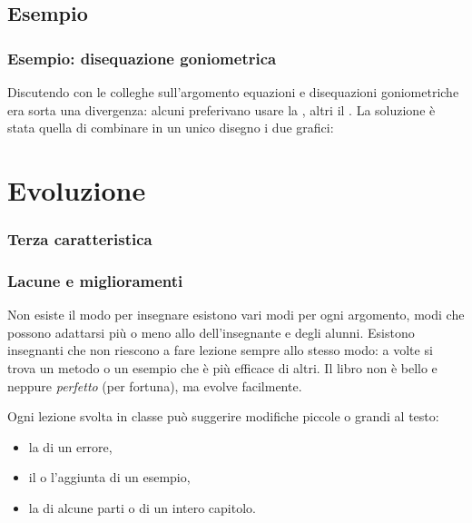 \documentclass{beamer} %
\begin{document}
\subsection{Esempio} 

\begin{frame}\frametitle{Esempio: disequazione goniometrica}

Discutendo con le colleghe sull'argomento equazioni e 
disequazioni goniometriche era sorta una divergenza: alcuni preferivano 
usare la , 
altri il .
\spause
La soluzione è stata quella di combinare in un unico disegno i due grafici: 

\begin{center}
\disequazionegon
\end{center}

\end{frame}


\section{Evoluzione}


\begin{frame}\frametitle{Terza caratteristica}

\begin{center}  \end{center}

\end{frame}


\begin{frame}\frametitle{Lacune e miglioramenti}

Non esiste il modo  per insegnare
esistono vari modi per ogni argomento, 
modi che possono adattarsi più o meno allo  
dell'insegnante e degli alunni. 
\spause
Esistono insegnanti che non riescono a fare lezione sempre allo stesso 
modo: a volte si trova un metodo o un esempio che è più efficace di altri.
\spause
Il libro non è bello e neppure \emph{perfetto} (per fortuna), 
ma evolve facilmente.

\pause
Ogni lezione svolta in classe può suggerire modifiche piccole o grandi al 
testo: 
\begin{itemize}
\item la  di un errore, 
\item il  o l'aggiunta di un esempio, 
\item la  di alcune parti o di un intero capitolo.
\end{itemize}



\end{frame}
\end{document}
